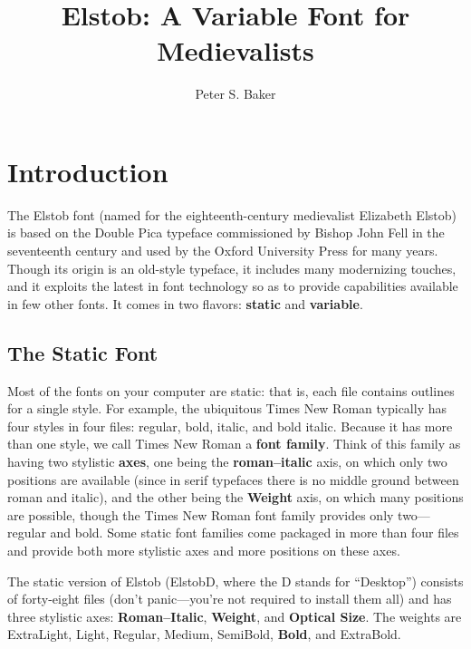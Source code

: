 \documentclass[12pt,letterpaper,openany]{book}
\title{Elstob: A Variable Font for Medievalists}
\author{Peter S. Baker}
\begin{document}
\maketitle

\chapter{Introduction}

\pagestyle{fancy}

The Elstob font (named for the eighteenth-century medievalist Elizabeth Elstob)
is based on the Double Pica typeface commissioned by Bishop John Fell in the
seventeenth century and used by the Oxford University Press for many years.
Though its origin is an old-style typeface, it includes many modernizing touches,
and it exploits the latest in font technology so as to provide capabilities
available in few other fonts. It comes in two flavors: \textbf{static} and
\textbf{variable}.

\section{The Static Font}

Most of the fonts on your
computer are static: that is, each file contains outlines for a single style.
For example, the ubiquitous Times New Roman typically has four styles in four
files: regular, bold, italic, and bold italic. Because it has more than one
style, we call Times New Roman a \textbf{font family}. Think of this family as
having two stylistic \textbf{axes}, one being the \textbf{roman--italic} axis, on which
only two positions are available (since in serif typefaces there is no middle
ground between roman and italic), and
the other being the \textbf{Weight} axis, on which many positions are possible,
though the Times New Roman font family provides only two---regular and bold.
Some static font families come packaged in more than four files and provide both more
stylistic axes and more positions on these axes.

The static version of Elstob (ElstobD, where the D stands for “Desktop”) consists
of forty-eight files (don’t panic---you’re not required to install them all) and
has three stylistic
axes: \textbf{Roman--Italic}, \textbf{Weight}, and \textbf{Optical Size}. The
weights are {\extralight ExtraLight}, {\light Light}, Regular, {\medium Medium},
{\semibold SemiBold}, \textbf{Bold}, and {\extrabold ExtraBold}.
\end{document}
